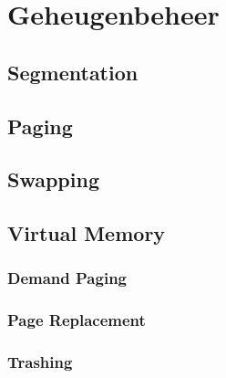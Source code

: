\chapter{Geheugenbeheer}


\section{Segmentation}


\section{Paging}


\section{Swapping}


\section{Virtual Memory}


\subsection{Demand Paging}


\subsection{Page Replacement}


\subsection{Trashing}

